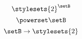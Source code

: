 \begin{forslides}
\begin{equation}
\end{equation}
\begin{equation}\label{eq:slides_session2_185}
\stylesets{2}^\setB
\end{equation}
\begin{equation}\label{eq:slides_session2_186}
\powerset \setB
\end{equation}
\begin{equation}\label{eq:slides_session2_187}
\setB \to \stylesets{2}
\end{equation}
%
%
%
%
%
%
%
%
%
%
%
%
%
%

\end{forslides}
